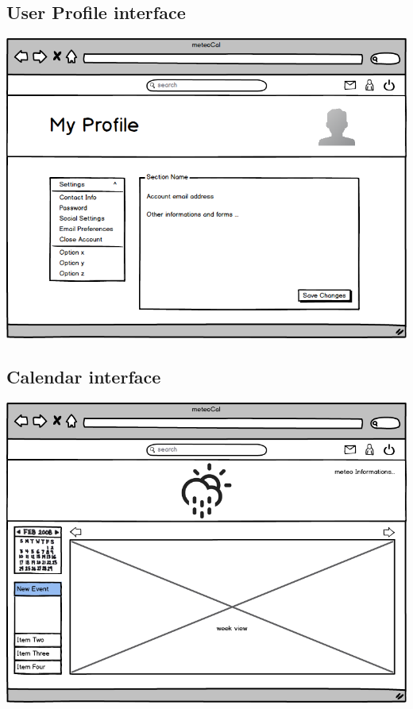 \documentclass[12pt]{book}
\begin{document}
\subsection{User Profile interface}
\begin{center}
\includegraphics[scale=0.4]{mockup_profilesettingpage}
\end{center}
\subsection{Calendar interface}
\begin{center}
\includegraphics[scale=0.4]{mockup_calendarpage}
\end{center}
\end{document}
